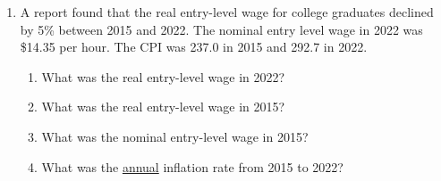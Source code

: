 \documentclass{article}
\begin{document}
\begin{enumerate}
\item A report found that the real entry-level wage for college graduates declined by 5\% between 2015 and 2022. The nominal entry level wage in 2022 was \$14.35 per hour. The CPI was 237.0 in 2015 and 292.7 in 2022.

	\begin{enumerate}
	
	\item What was the real entry-level wage in 2022?
	
	\item What was the real entry-level wage in 2015?
	
	\item What was the nominal entry-level wage in 2015?
	
	\item What was the \underline{annual} inflation rate from 2015 to 2022?
	
	\end{enumerate}

\end{enumerate}
\end{document}

